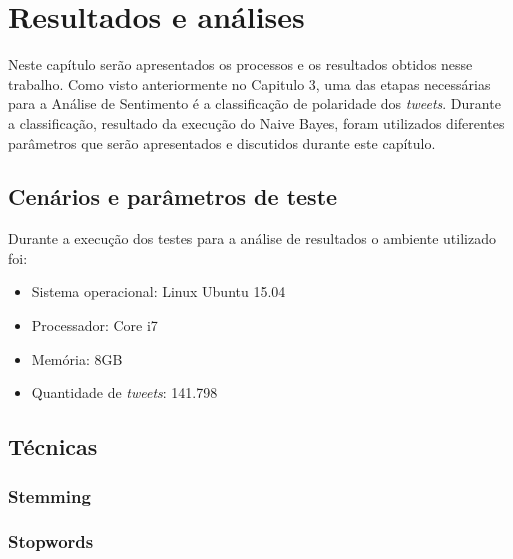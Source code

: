 \chapter{Resultados e análises}\label{cap:resultados}

Neste capítulo serão apresentados os processos e os resultados obtidos nesse trabalho. Como visto anteriormente no Capitulo 3,  uma das etapas
necessárias para a Análise de Sentimento é a classificação de polaridade dos \textit{tweets}. Durante a classificação, resultado da execução do Naive Bayes, foram utilizados diferentes parâmetros que serão apresentados e discutidos durante este capítulo.

\section{Cenários e parâmetros de teste}\label{sec:cenarios}
Durante a execução dos testes para a análise de resultados o ambiente utilizado foi:
\begin{itemize}
	\item Sistema operacional: Linux Ubuntu 15.04
	\item Processador: Core i7
	\item Memória: 8GB
	\item Quantidade de \textit{tweets}: 141.798
\end{itemize}

\section{Técnicas}
\subsection{Stemming}
\subsection{Stopwords}
